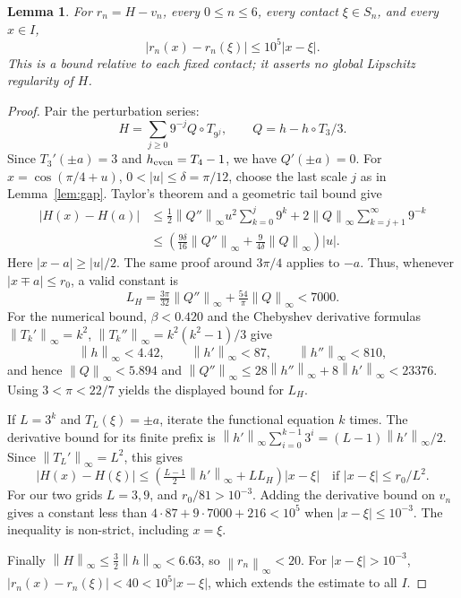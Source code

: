 \documentclass[11pt]{article}
\newtheorem{lemma}{Lemma}
\newcommand{\norm}[1]{\left\lVert #1\right\rVert_\infty}
\begin{document}
\begin{lemma}\label{lem:lip}
For $r_n=H-v_n$, every $0\le n\le6$, every contact $\xi\in S_n$, and
every $x\in I$,
\[
 |r_n(x)-r_n(\xi)|\le 10^5|x-\xi|.
\]
This is a bound relative to each fixed contact; it asserts no global
Lipschitz regularity of $H$.
\end{lemma}
\begin{proof}
Pair the perturbation series:
\[
 H=\sum_{j\ge0}9^{-j}Q\circ T_{9^j},\qquad Q=h-h\circ T_3/3.
\]
Since $T_3'(\pm a)=3$ and $h_{\rm even}=T_4-1$, we have
$Q'(\pm a)=0$. For $x=\cos(\pi/4+u)$, $0<|u|\le\delta=\pi/12$,
choose the last scale $j$ as in Lemma~\ref{lem:gap}. Taylor's theorem and a
geometric tail bound give
\begin{align*}
 |H(x)-H(a)|
 &\le \tfrac12\norm{Q''}u^2\sum_{k=0}^{j}9^k
                  +2\norm Q\sum_{k=j+1}^\infty9^{-k}\\
 &\le \left(\tfrac{9\delta}{16}\norm{Q''}
                  +\tfrac9{4\delta}\norm Q\right)|u|.
\end{align*}
Here $|x-a|\ge|u|/2$. The same proof around $3\pi/4$ applies to $-a$.
Thus, whenever $|x\mp a|\le r_0$, a valid constant is
\[
 L_H=\tfrac{3\pi}{32}\norm{Q''}+\tfrac{54}{\pi}\norm Q<7000.
\]
For the numerical bound, $\beta<0.420$ and the Chebyshev derivative formulas
$\norm{T_k'}=k^2$, $\norm{T_k''}=k^2(k^2-1)/3$ give
\[
 \norm h<4.42,\qquad\norm{h'}<87,\qquad\norm{h''}<810,
\]
and hence $\norm Q<5.894$ and
$\norm{Q''}\le28\norm{h''}+8\norm{h'}<23376$.
Using $3<\pi<22/7$ yields the displayed bound for $L_H$.

If $L=3^k$ and $T_L(\xi)=\pm a$, iterate the functional equation $k$ times.
The derivative bound for its finite prefix is
$\norm{h'}\sum_{i=0}^{k-1}3^i=(L-1)\norm{h'}/2$.
Since $\norm{T_L'}=L^2$, this gives
\[
 |H(x)-H(\xi)|\le\left(\tfrac{L-1}{2}\norm{h'}+LL_H\right)|x-\xi|
 \quad\text{if } |x-\xi|\le r_0/L^2.
\]
For our two grids $L=3,9$, and $r_0/81>10^{-3}$.
Adding the derivative bound on $v_n$ gives a constant less than
$4\cdot87+9\cdot7000+216<10^5$ when $|x-\xi|\le10^{-3}$.
The inequality is non-strict, including $x=\xi$.

Finally $\norm H\le\tfrac32\norm h<6.63$, so $\norm{r_n}<20$.
For $|x-\xi|>10^{-3}$,
$|r_n(x)-r_n(\xi)|<40<10^5|x-\xi|$, which extends the estimate to all $I$.
\end{proof}
\end{document}
